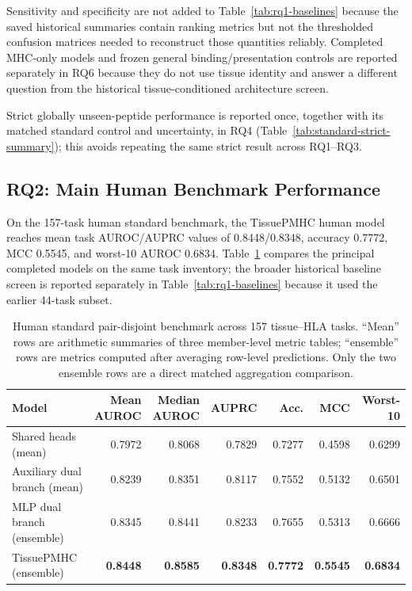 Sensitivity and specificity are not added to Table~\ref{tab:rq1-baselines} because the saved historical summaries contain ranking metrics but not the thresholded confusion matrices needed to reconstruct those quantities reliably. Completed MHC-only models and frozen general binding/presentation controls are reported separately in RQ6 because they do not use tissue identity and answer a different question from the historical tissue-conditioned architecture screen.

Strict globally unseen-peptide performance is reported once, together with its matched standard control and uncertainty, in RQ4 (Table~\ref{tab:standard-strict-summary}); this avoids repeating the same strict result across RQ1--RQ3.

\subsection{RQ2: Main Human Benchmark Performance}

On the 157-task human standard benchmark, the TissuePMHC human model reaches mean task AUROC/AUPRC values of 0.8448/0.8348, accuracy 0.7772, MCC 0.5545, and worst-10 AUROC 0.6834. Table~\ref{tab:human-standard} compares the principal completed models on the same task inventory; the broader historical baseline screen is reported separately in Table~\ref{tab:rq1-baselines} because it used the earlier 44-task subset.

\begin{table}[tbp]
\centering
\caption{Human standard pair-disjoint benchmark across 157 tissue--HLA tasks. ``Mean'' rows are arithmetic summaries of three member-level metric tables; ``ensemble'' rows are metrics computed after averaging row-level predictions. Only the two ensemble rows are a direct matched aggregation comparison.}
\label{tab:human-standard}
\footnotesize
\setlength{\tabcolsep}{2pt}
\begin{tabular}{lrrrrrr}
\toprule
Model & \shortstack{Mean\\AUROC} & \shortstack{Median\\AUROC} & AUPRC & Acc. & MCC & Worst-10 \\ 
\midrule
Shared heads (mean) & 0.7972 & 0.8068 & 0.7829 & 0.7277 & 0.4598 & 0.6299 \\ 
Auxiliary dual branch (mean) & 0.8239 & 0.8351 & 0.8117 & 0.7552 & 0.5132 & 0.6501 \\ 
MLP dual branch (ensemble) & 0.8345 & 0.8441 & 0.8233 & 0.7655 & 0.5313 & 0.6666 \\ 
TissuePMHC (ensemble) & \textbf{0.8448} & \textbf{0.8585} & \textbf{0.8348} & \textbf{0.7772} & \textbf{0.5545} & \textbf{0.6834} \\ 
\bottomrule
\end{tabular}
\end{table}

